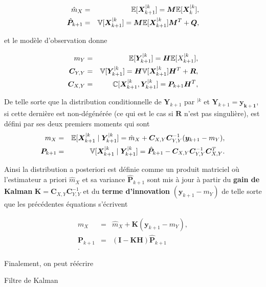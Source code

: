 \begin{eqnarray*}
    \hat m_X &=& \mathbb{E} [\bm X_{k+1}^{\mid k}] = \bm M \mathbb{E} [\bm X_{k}^{\mid k}],\\
    \hat{\bm  P}_{k+1} &=& \mathbb{V} [\bm X_{k+1}^{\mid k}] = \bm M \mathbb{E} [\bm X_{k+1}^{\mid k}] \bm M^T + \bm Q,
\end{eqnarray*}

et le modèle d'observation donne

\begin{eqnarray*}
    m_Y &=& \mathbb{E} [\bm Y_{k+1}^{\mid k}] = \bm H \mathbb{E} [X_{k+1}^{\mid k}],\\
    \bm C_{Y,Y}&=&\mathbb{V} [\bm Y_{k+1}^{\mid k}] = \bm H \mathbb{V} [\bm X_{k+1}^{\mid k}] \bm H^T + \bm R, \\
    \bm C_{X,Y} &=& \mathbb{C}[\bm X_{k+1}^{\mid k},\bm Y^{\mid k}_{k+1}] = \bm P_{k+1} \bm H^T,
\end{eqnarray*}

De telle sorte que la distribution conditionnelle de $\bm Y_{k+1}$ par $^{\mid k}$ et $\bm Y_{k+1} = \bm{y_{k+1}}$, si cette dernière est non-dégénérée (ce qui est le cas si $\bm R$ n'est pas singulière), est défini par ses deux premiers moments qui sont
\begin{eqnarray*}
    m_X &=& \mathbb{E}[\bm X^{\mid k}_{k+1} \mid \bm Y_{k+1}^{\mid k}] = \hat m_X + \bm C_{X,Y} \bm C_{Y,Y}^{-1} (\bm y_{k+1} - m_Y), \\
    \bm P_{k+1} &=& \mathbb{V}[\bm X^{\mid k}_{k+1} \mid \bm Y_{k+1}^{\mid k}] = \hat{\bm  P}_{k+1} - \bm C_{X,Y} \bm C_{Y,Y}^{-1} \bm C_{X,Y}^T.
\end{eqnarray*}

Ainsi la distribution a posteriori est définie comme un produit matriciel où l'estimateur a priori $\hat m_X$ et sa variance $\hat{\bm  P}_{k+1}$ sont mis à jour à partir du \textbf{gain de Kalman} $\bm K = \bm C_{X,Y} \bm C_{Y,Y}^{-1} $ et du \textbf{terme d'innovation} $(\bm y_{k+1} - m_Y)$ de telle sorte que les précédentes équations s'écrivent

\begin{eqnarray*}
    m_X &=& \hat m_X + \bm K (\bm y_{k+1} - m_Y), \\
    \bm P_{k+1} &=& (\bm I - \bm K\bm H)\hat{\bm  P}_{k+1} \\.
\end{eqnarray*}

Finalement, on peut réécrire
\begin{algorithm}
    \caption{Filtre de Kalman}
\end{algorithm}

